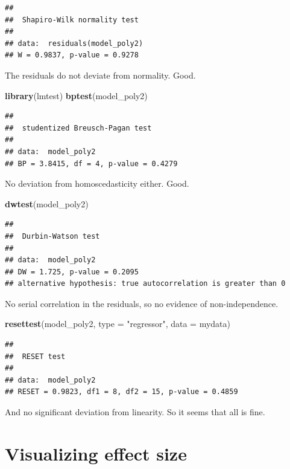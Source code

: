 \documentclass[
  12pt,
]{book}
\newenvironment{Shaded}{\begin{snugshade}}{\end{snugshade}}
\newcommand{\DataTypeTok}[1]{\textcolor[rgb]{0.13,0.29,0.53}{#1}}
\newcommand{\KeywordTok}[1]{\textcolor[rgb]{0.13,0.29,0.53}{\textbf{#1}}}
\newcommand{\NormalTok}[1]{#1}
\newcommand{\StringTok}[1]{\textcolor[rgb]{0.31,0.60,0.02}{#1}}
\begin{document}
\begin{verbatim}
## 
##  Shapiro-Wilk normality test
## 
## data:  residuals(model_poly2)
## W = 0.9837, p-value = 0.9278
\end{verbatim}

The residuals do not deviate from normality. Good.

\begin{Shaded}
\begin{Highlighting}[]
\KeywordTok{library}\NormalTok{(lmtest)}
\KeywordTok{bptest}\NormalTok{(model\_poly2)}
\end{Highlighting}
\end{Shaded}

\begin{verbatim}
## 
##  studentized Breusch-Pagan test
## 
## data:  model_poly2
## BP = 3.8415, df = 4, p-value = 0.4279
\end{verbatim}

No deviation from homoscedasticity either. Good.

\begin{Shaded}
\begin{Highlighting}[]
\KeywordTok{dwtest}\NormalTok{(model\_poly2)}
\end{Highlighting}
\end{Shaded}

\begin{verbatim}
## 
##  Durbin-Watson test
## 
## data:  model_poly2
## DW = 1.725, p-value = 0.2095
## alternative hypothesis: true autocorrelation is greater than 0
\end{verbatim}

No serial correlation in the residuals, so no evidence of non-independence.

\begin{Shaded}
\begin{Highlighting}[]
\KeywordTok{resettest}\NormalTok{(model\_poly2, }\DataTypeTok{type =} \StringTok{"regressor"}\NormalTok{, }\DataTypeTok{data =}\NormalTok{ mydata)}
\end{Highlighting}
\end{Shaded}

\begin{verbatim}
## 
##  RESET test
## 
## data:  model_poly2
## RESET = 0.9823, df1 = 8, df2 = 15, p-value = 0.4859
\end{verbatim}

And no significant deviation from linearity. So it seems that all is fine.

\hypertarget{visualizing-effect-size}{%
\section{Visualizing effect size}\label{visualizing-effect-size}}
\end{document}
